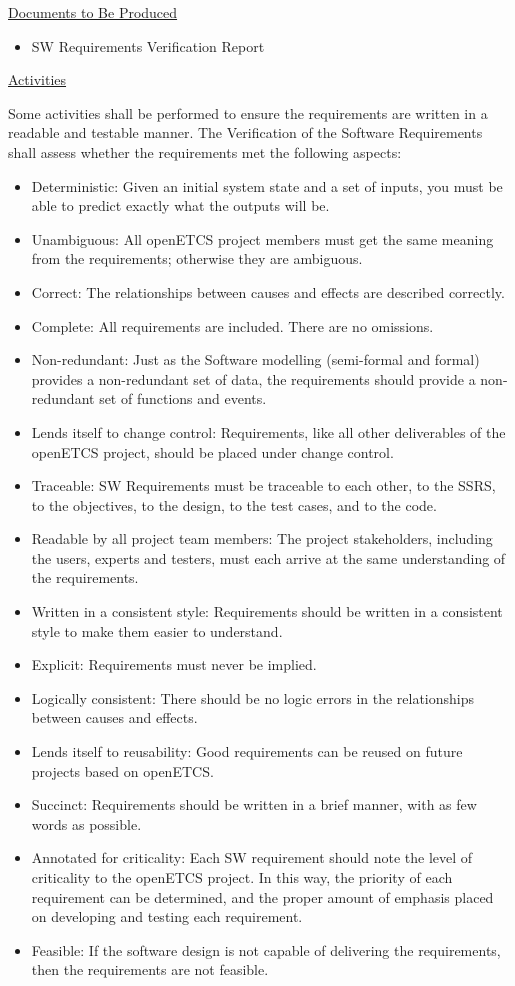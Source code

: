 \documentclass{template/openetcs_report}
\begin{document}
\underline{Documents to Be Produced} 

\begin{itemize}
\item SW Requirements Verification Report
\end{itemize}

\underline{Activities}

Some activities shall be performed to ensure the requirements are written in a readable and testable manner. The Verification of the Software Requirements shall assess whether the requirements met the following aspects:
\begin{itemize}
\item Deterministic: Given an initial system state and a set of inputs, you must be able to predict exactly what the outputs will be.
\item Unambiguous: All openETCS project members must get the same meaning from the requirements; otherwise they are ambiguous.
\item Correct: The relationships between causes and effects are described correctly.
\item Complete: All requirements are included. There are no omissions.
\item Non-redundant: Just as the Software modelling (semi-formal and formal) provides a non-redundant set of data, the requirements should provide a non-redundant set of functions and events.
\item Lends itself to change control: Requirements, like all other deliverables of the openETCS project, should be placed under change control.
\item Traceable: SW Requirements must be traceable to each other, to the SSRS, to the objectives, to the design, to the test cases, and to the code.
\item Readable by all project team members: The project stakeholders, including the users, experts and testers, must each arrive at the same understanding of the requirements.
\item Written in a consistent style: Requirements should be written in a consistent style to make them easier to understand.
\item Explicit: Requirements must never be implied.
\item Logically consistent: There should be no logic errors in the relationships between causes and effects.
\item Lends itself to reusability: Good requirements can be reused on future projects based on openETCS.
\item Succinct: Requirements should be written in a brief manner, with as few words as possible.
\item Annotated for criticality: Each SW requirement should note the level of criticality to the openETCS project. In this way, the priority of each requirement can be determined, and the proper amount of
emphasis placed on developing and testing each requirement.
\item Feasible: If the software design is not capable of delivering the requirements, then the requirements are not feasible.
\end{itemize}
\end{document}
